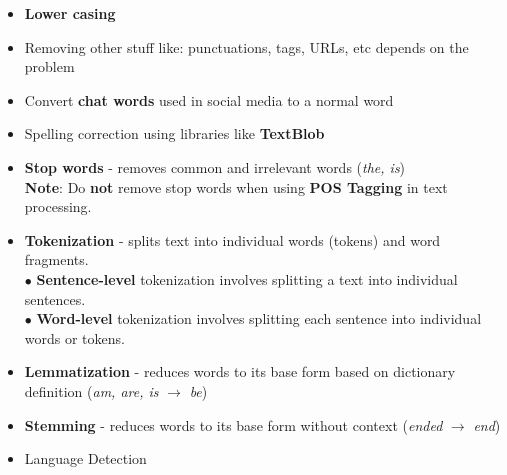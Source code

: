 \documentclass[letterpaper, 10.5pt,landscape]{article}
\begin{document}
\begin{multicols*}{3}
\begin{itemize}[label={--},leftmargin=4mm]
\vspace{-3pt}
\item \textbf{Lower casing}
\vspace{-3pt}

\item Removing other stuff like: punctuations, tags, URLs, etc depends on the problem
\vspace{-3pt}

\item Convert \textbf{chat words} used in social media to a normal word 
\vspace{-3pt}

\item Spelling correction using libraries like \textbf{TextBlob}
\vspace{-3pt}

\item \textbf{Stop words} - removes common and irrelevant words (\emph{the, is}) \\
\textbf{Note}: Do \textbf{not} remove stop words when using \textbf{POS Tagging} in text processing.
\vspace{-3pt}


\item \textbf{Tokenization} - splits text into individual words (tokens) and word fragments. \\
$\bullet$ \textbf{Sentence-level} tokenization involves splitting a text into individual sentences. \\
$\bullet$ \textbf{Word-level} tokenization involves splitting each sentence into individual words or tokens.
\vspace{-3pt}



\item \textbf{Lemmatization} - reduces words to its base form based on dictionary definition (\emph{am, are, is} $\to$ \emph{be})
\vspace{-3pt}

\item \textbf{Stemming} - reduces words to its base form without context (\emph{ended} $\to$ \emph{end})
\vspace{-3pt}

\item Language Detection
\vspace{-3pt}
\end{itemize}






\end{multicols*}
\end{document}
